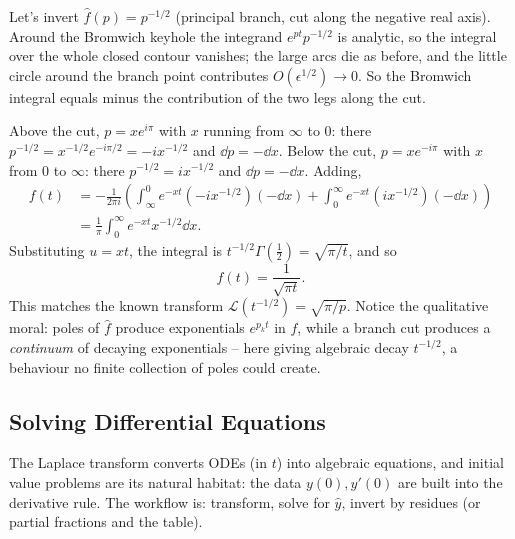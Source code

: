 \begin{example}
	Let's invert $\hat f(p) = p^{-1/2}$ (principal branch, cut along the negative real axis). Around the Bromwich keyhole the integrand $e^{pt} p^{-1/2}$ is analytic, so the integral over the whole closed contour vanishes; the large arcs die as before, and the little circle around the branch point contributes $O(\epsilon^{1/2}) \to 0$. So the Bromwich integral equals minus the contribution of the two legs along the cut.

	Above the cut, $p = xe^{i\pi}$ with $x$ running from $\infty$ to $0$: there $p^{-1/2} = x^{-1/2} e^{-i\pi/2} = -ix^{-1/2}$ and $\dd p = -\dd x$. Below the cut, $p = x e^{-i\pi}$ with $x$ from $0$ to $\infty$: there $p^{-1/2} = ix^{-1/2}$ and $\dd p = -\dd x$. Adding,
	\begin{align*}
	f(t) &= -\frac{1}{2\pi i}\left(\int_\infty^0 e^{-xt}(-ix^{-1/2})(-\dd x) + \int_0^\infty e^{-xt} (i x^{-1/2})(-\dd x) \right) \\
	&= \frac{1}{\pi} \int_0^\infty e^{-xt} x^{-1/2} \dd x.
	\end{align*}
	Substituting $u = xt$, the integral is $t^{-1/2} \Gamma(\frac 12) = \sqrt{\pi/t}$, and so
	$$
	f(t) = \frac{1}{\sqrt{\pi t}}.
	$$
	This matches the known transform $\mathcal L(t^{-1/2}) = \sqrt{\pi/p}$. Notice the qualitative moral: poles of $\hat f$ produce exponentials $e^{p_k t}$ in $f$, while a branch cut produces a \emph{continuum} of decaying exponentials -- here giving algebraic decay $t^{-1/2}$, a behaviour no finite collection of poles could create.
\end{example}

\subsection{Solving Differential Equations}

The Laplace transform converts ODEs (in $t$) into algebraic equations, and initial value problems are its natural habitat: the data $y(0), y'(0)$ are built into the derivative rule. The workflow is: transform, solve for $\hat y$, invert by residues (or partial fractions and the table).

